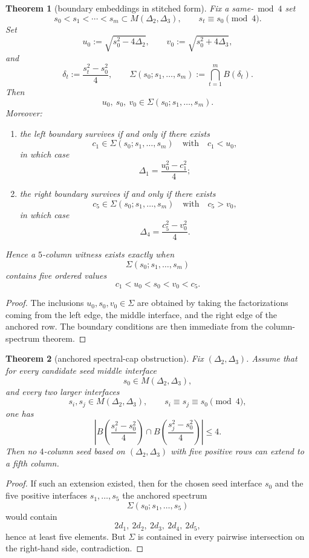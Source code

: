 \documentclass[11pt]{article}
\theoremstyle{plainbreak}
\newtheorem{theorem}{Theorem}[section]
\theoremstyle{defbreak}
\newcommand{\Bset}{B}
\newcommand{\Mset}{M}
\begin{document}
\begin{theorem}[boundary embeddings in stitched form]
Fix a same-$\bmod 4$ set
\[
s_0<s_1<\cdots<s_m\subset \Mset(\Delta_2,\Delta_3),
\qquad s_t\equiv s_0\pmod 4.
\]
Set
\[
u_0:=\sqrt{s_0^2-4\Delta_2},\qquad
v_0:=\sqrt{s_0^2+4\Delta_3},
\]
and
\[
\delta_t:=\frac{s_t^2-s_0^2}{4},
\qquad
\Sigma(s_0;s_1,\dots,s_m):=\bigcap_{t=1}^m \Bset(\delta_t).
\]
Then
\[
u_0,\ s_0,\ v_0\in \Sigma(s_0;s_1,\dots,s_m).
\]
Moreover:
\begin{enumerate}[label=\textup{(\roman*)}]
    \item the left boundary survives if and only if there exists
    \[
    c_1\in \Sigma(s_0;s_1,\dots,s_m)\quad\text{with}\quad c_1<u_0,
    \]
    in which case
    \[
    \Delta_1=\frac{u_0^2-c_1^2}{4};
    \]
    \item the right boundary survives if and only if there exists
    \[
    c_5\in \Sigma(s_0;s_1,\dots,s_m)\quad\text{with}\quad c_5>v_0,
    \]
    in which case
    \[
    \Delta_4=\frac{c_5^2-v_0^2}{4}.
    \]
\end{enumerate}
Hence a $5$-column witness exists exactly when
\[
\Sigma(s_0;s_1,\dots,s_m)
\]
contains five ordered values
\[
c_1<u_0<s_0<v_0<c_5.
\]
\end{theorem}

\begin{proof}
The inclusions $u_0,s_0,v_0\in \Sigma$ are obtained by taking the factorizations coming from the left edge, the middle interface, and the right edge of the anchored row.  The boundary conditions are then immediate from the column-spectrum theorem.
\end{proof}

\begin{theorem}[anchored spectral-cap obstruction]
Fix $(\Delta_2,\Delta_3)$. Assume that for every candidate seed middle interface
\[
s_0\in \Mset(\Delta_2,\Delta_3),
\]
and every two larger interfaces
\[
s_i,s_j\in \Mset(\Delta_2,\Delta_3),\qquad
s_i\equiv s_j\equiv s_0\pmod 4,
\]
one has
\[
\left|
\Bset\!\left(\frac{s_i^2-s_0^2}{4}\right)
\cap
\Bset\!\left(\frac{s_j^2-s_0^2}{4}\right)
\right|
\le 4.
\]
Then no $4$-column seed based on $(\Delta_2,\Delta_3)$ with five positive rows can extend to a fifth column.
\end{theorem}

\begin{proof}
If such an extension existed, then for the chosen seed interface $s_0$ and the five positive interfaces $s_1,\dots,s_5$ the anchored spectrum
\[
\Sigma(s_0;s_1,\dots,s_5)
\]
would contain
\[
2d_1,\ 2d_2,\ 2d_3,\ 2d_4,\ 2d_5,
\]
hence at least five elements. But $\Sigma$ is contained in every pairwise intersection on the right-hand side, contradiction.
\end{proof}
\end{document}
